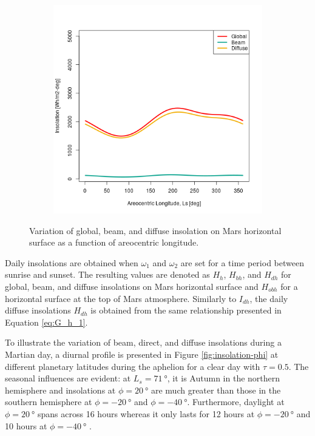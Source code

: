 \begin{figure}[H]
\begin{subfigure}[t]{\subfigureWidth}
  		\label{fig:sub:insolation-ls-tau-factor-2}
  	\end{subfigure}\hfill
	   \begin{subfigure}[t]{\subfigureWidth}
      \centering
  		\includegraphics[height=\graphicsHeight]{sections/martian-environment/plots/variation-of-global-beam-and-diffuse-insolation-on-mars-horizontal-surface-as-a-function-of-areocentric-longitude-for-tau3-and-phi205.png}
  		\label{fig:sub:insolation-ls-tau-factor-3}
	   \end{subfigure}\hfill
	\caption{Variation of global, beam, and diffuse insolation on Mars horizontal surface as a function of areocentric longitude.}
	\label{fig:insolation-ls}
\vspace{-2ex}
\end{figure}

Daily insolations are obtained when $\omega_1$ and $\omega_2$ are set for a time period between sunrise and sunset. The resulting values are denoted as $H_{h}$, $H_{bh}$, and $H_{dh}$ for global, beam, and diffuse insolations on Mars horizontal surface and $H_{obh}$ for a horizontal surface at the top of Mars atmosphere. Similarly to $I_{dh}$, the daily diffuse insolations $H_{dh}$ is obtained from the same relationship presented in Equation \ref{eq:G_h_1}.

To illustrate the variation of beam, direct, and diffuse insolations during a Martian day, a diurnal profile is presented in Figure \ref{fig:insolation-phi} at different planetary latitudes during the aphelion for a clear day with $\tau = 0.5$. The seasonal influences are evident: at $L_{s} = \SI{71}{\degree}$, it is Autumn in the northern hemisphere and insolations at $\phi = \SI{20}{\degree}$ are much greater than those in the southern hemisphere at $\phi = \SI{-20}{\degree}$ and $\phi = \SI{-40}{\degree}$. Furthermore, daylight at $\phi = \SI{20}{\degree}$ spans across 16 hours whereas it only lasts for 12 hours at $\phi = \SI{-20}{\degree}$ and 10 hours at $\phi = \SI{-40}{\degree}$ .


